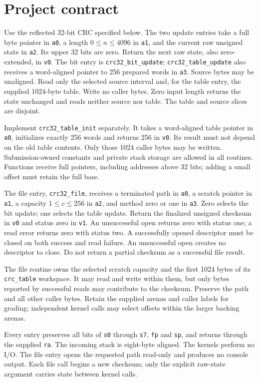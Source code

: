 \section*{Project contract}
Use the reflected 32-bit CRC specified below. The two update entries take a full byte
pointer in \texttt{a0}, a length \(0\leq n\leq4096\) in \texttt{a1}, and the
current raw unsigned state in \texttt{a2}. Its upper 32 bits are zero. Return the next
raw state, also zero-extended, in \texttt{v0}. The bit entry is
\texttt{crc32\_bit\_update}; \texttt{crc32\_table\_update} also receives a
word-aligned pointer to 256 prepared words in \texttt{a3}. Source bytes may be unaligned.
Read only the selected source interval and, for the table entry, the supplied 1024-byte
table. Write no caller bytes. Zero input length returns the state unchanged and reads
neither source nor table. The table and source slices are disjoint.

Implement \texttt{crc32\_table\_init} separately. It takes a word-aligned table
pointer in \texttt{a0}, initializes exactly 256 words and returns 256 in
\texttt{v0}. Its result must not depend on the old table contents. Only those
1024 caller bytes may be written. Submission-owned constants and private stack storage
are allowed in all routines. Functions receive full pointers, including addresses above
32 bits; adding a small offset must retain the full base.

The file entry, \texttt{crc32\_file}, receives a terminated path in \texttt{a0},
a scratch pointer in \texttt{a1}, a capacity \(1\leq c\leq256\) in
\texttt{a2}, and method zero or one in \texttt{a3}. Zero selects the bit update;
one selects the table update. Return the finalized unsigned checksum in \texttt{v0}
and status zero in \texttt{v1}. An unsuccessful open returns zero with status one;
a read error returns zero with status two. A successfully opened descriptor must be
closed on both success and read failure. An unsuccessful open creates no descriptor
to close. Do not return a partial checksum as a successful file result.

The file routine owns the selected scratch capacity and the first 1024 bytes of its
\texttt{crc\_table} workspace. It may read and write within them, but only bytes
reported by successful reads may contribute to the checksum. Preserve the path and
all other caller bytes. Retain the supplied arenas and caller labels for grading;
independent kernel calls may select offsets within the larger backing arenas.

Every entry preserves all bits of \texttt{s0} through \texttt{s7}, \texttt{fp}
and \texttt{sp}, and returns through the supplied \texttt{ra}. The incoming stack
is eight-byte aligned. The kernels perform no I/O. The file entry opens the requested
path read-only and produces no console output. Each file call begins a new checksum;
only the explicit raw-state argument carries state between kernel calls.

